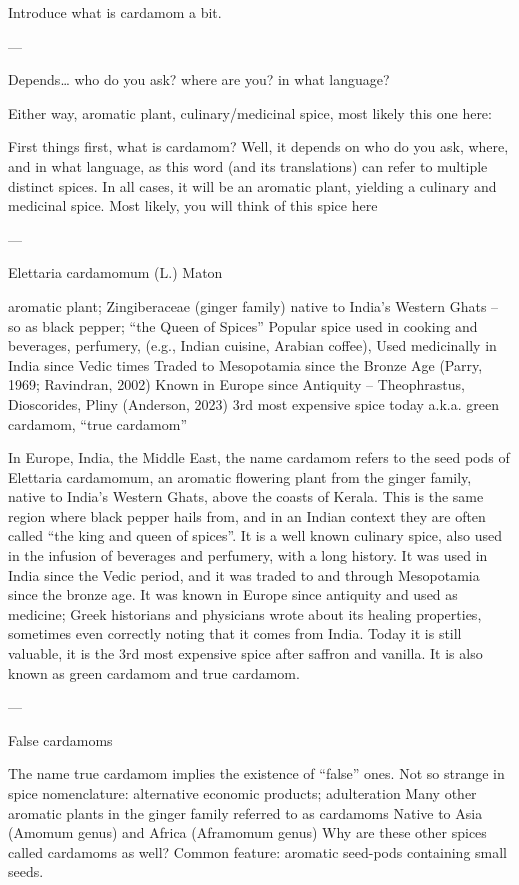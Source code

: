 \documentclass[12pt]{article}
\begin{document}
Introduce what is cardamom a bit.

---

Depends…
who do you ask?
where are you?
in what language?

Either way,
aromatic plant,
culinary/medicinal spice,
most likely this one here:


First things first, what is cardamom? 
Well, it depends on who do you ask, where, and in what language, as this word (and its translations) can refer to multiple distinct spices.
In all cases, it will be an aromatic plant, yielding a culinary and medicinal spice. Most likely, you will think of this spice here

---

Elettaria cardamomum (L.) Maton

aromatic plant; Zingiberaceae (ginger family)
native to India’s Western Ghats – so as black pepper; “the Queen of Spices”
Popular spice used in cooking and beverages, perfumery, (e.g., Indian cuisine, Arabian coffee), 
Used medicinally in India since Vedic times
Traded to Mesopotamia since the Bronze Age (Parry, 1969; Ravindran, 2002)
Known in Europe since Antiquity – Theophrastus, Dioscorides, Pliny (Anderson, 2023)
3rd most expensive spice today
a.k.a. green cardamom, “true cardamom”



In Europe, India, the Middle East, the name cardamom refers to the seed pods of Elettaria cardamomum, 
an aromatic flowering plant from the ginger family, 
native to India’s Western Ghats, above the coasts of Kerala. This is the same region where black pepper hails from, and in an Indian context they are often called “the king and queen of spices”.
It is a well known culinary spice, also used in the infusion of beverages and perfumery, with a long history. 
It was used in India since the Vedic period, and 
it was traded to and through Mesopotamia since the bronze age. 
It was known in Europe since antiquity and used as medicine; Greek historians and physicians wrote about its healing properties, sometimes even correctly noting that it comes from India.
Today it is still valuable, it is the 3rd most expensive spice after saffron and vanilla.
It is also known as green cardamom and true cardamom.

---

False cardamoms

The name true cardamom implies the existence of “false” ones.
Not so strange in spice nomenclature: alternative economic products; adulteration
Many other aromatic plants in the ginger family referred to as cardamoms
Native to Asia (Amomum genus) and Africa (Aframomum genus)
Why are these other spices called cardamoms as well?
Common feature: aromatic seed-pods containing small seeds.
\end{document}
